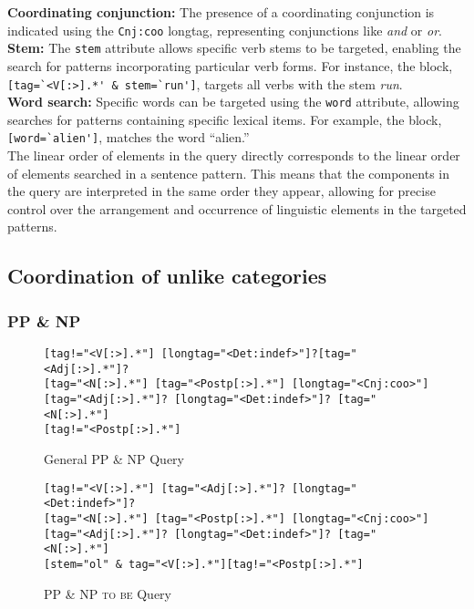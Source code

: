 \noindent \textbf{Coordinating conjunction:} The presence of a coordinating conjunction is indicated using the \Verb"Cnj:coo" longtag, representing conjunctions like \textit{and} or \textit{or}. \\

\noindent \textbf{Stem:} The \Verb"stem" attribute allows specific verb stems to be targeted, enabling the search for patterns incorporating particular verb forms. For instance, the block, \Verb"[tag=`<V[:>].*' & stem=`run']", targets all verbs with the stem \textit{run}.\\

\noindent \textbf{Word search:} Specific words can be targeted using the \Verb"word" attribute, allowing searches for patterns containing specific lexical items. For example, the block, \Verb"[word=`alien']", matches the word ``alien.''\\

The linear order of elements in the query directly corresponds to the linear order of elements searched in a sentence pattern. This means that the components in the query are interpreted in the same order they appear, allowing for precise control over the arrangement and occurrence of linguistic elements in the targeted patterns.

\subsection{Coordination of unlike categories}
\subsubsection{PP \& NP}

\begin{figure}[!h]
	\begin{lstlisting}
[tag!="<V[:>].*"] [longtag="<Det:indef>"]?[tag="<Adj[:>].*"]?
[tag="<N[:>].*"] [tag="<Postp[:>].*"] [longtag="<Cnj:coo>"]
[tag="<Adj[:>].*"]? [longtag="<Det:indef>"]? [tag="<N[:>].*"]
[tag!="<Postp[:>].*"]
		\end{lstlisting}
	\caption{General PP \& NP Query}
	\label{CQl_ppnp-general}
\end{figure}


\begin{figure}[!h]
	\begin{lstlisting}
[tag!="<V[:>].*"] [tag="<Adj[:>].*"]? [longtag="<Det:indef>"]? 
[tag="<N[:>].*"] [tag="<Postp[:>].*"] [longtag="<Cnj:coo>"]
[tag="<Adj[:>].*"]? [longtag="<Det:indef>"]? [tag="<N[:>].*"]
[stem="ol" & tag="<V[:>].*"][tag!="<Postp[:>].*"]
	\end{lstlisting}
	\caption{PP \& NP \textsc{to be} Query}
	\label{CQl_ppnp-olmak}
\end{figure}


